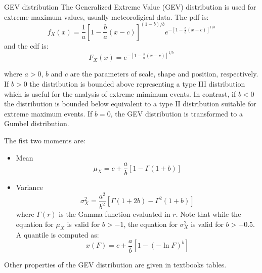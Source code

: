 \documentclass[8pt]{beamer}
\renewcommand{\emph}[1]{\textcolor{myorange}{#1}}
\begin{document}
\begin{frame}{GEV distribution}
    The \alert{Generalized Extreme Value (GEV) distribution} is used for extreme maximum values, usually meteoroligical data. The \emph{pdf} is:
    \[
        f_X (x) = \frac{1}{a} \left[ 1- \frac{b}{a} (x-c) \right]^{(1-b)/b} e^{ -\left[ 1- \frac{b}{a} (x-c) \right]^{1/b}}    
    \]
    and the \emph{cdf} is:
    \[
        F_X (x) = e^{ -\left[ 1- \frac{b}{a} (x-c) \right]^{1/b}}
    \]

    where $a>0$, $b$ and $c$ are the parameters of scale, shape and position, respectively. If $b>0$ the distribution is bounded above representing a type III distribution which is useful for the analysis of extreme mimimum events. In contrast, if $b<0$ the distribution is bounded below equivalent to a type II distribution suitable for extreme maximum events. If $b=0$, the \emph{GEV distribution} is transformed to a \emph{Gumbel distribution}. 

    The fist two moments are:
        \begin{itemize}
            \item \emph{Mean}
                \vspace{-5pt}
                \[
                    \mu_X = c + \frac{a}{b} [1- \Gamma (1+b) ] 
                \]

            \item \emph{Variance}
                \vspace{-5pt}
                \[
                    \sigma_X^2 = \frac{a^2}{b^2} [\Gamma (1 + 2b) - \Gamma^2 (1+b) ] 
                \]
                where $\Gamma(r)$ is the \emph{Gamma function} evaluated in $r$. Note that while the equation for $\mu_X$ is valid for $b > -1$, the equation for $\sigma_X^2$ is valid for $b > -0.5$. A quantile is computed as:
                \[
                    x(F) = c + \frac{a}{b} \left[ 1- (-\ln F)^b \right] 
                \]

        \end{itemize}
Other properties of the \emph{GEV distribution} are given in textbooks tables. 

\end{frame}
\end{document}
